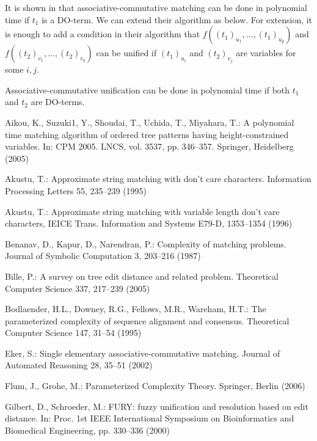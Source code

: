 \documentclass[a4paper]{llncs}
\begin{document}
It is shown in \cite{benanav87} that associative-commutative matching
can be done in polynomial time if $t_1$ is a DO-term.
We can extend their algorithm as below.
For extension, it is enough to add a condition in their algorithm that
$f((t_1)_{u_1},\ldots,(t_1)_{u_p})$ and
$f((t_2)_{v_1},\ldots,(t_2)_{v_q})$ can be unified
if $(t_1)_{u_i}$ and $(t_2)_{v_j}$ are variables for some $i,j$.

\begin{proposition}
Associative-commutative unification
can be done in polynomial time if both $t_1$ and $t_2$ are DO-terms.
\label{prop:do-ac-unif}
\end{proposition}

\begin{thebibliography}{99}

Aikou, K., Suzuki1, Y., Shoudai, T., Uchida, T., Miyahara, T.:
A polynomial time matching algorithm
of ordered tree patterns having height-constrained variables.
In: CPM 2005. LNCS, vol. 3537, pp. 346--357.
Springer, Heidelberg (2005)

Akustu, T.:
Approximate string matching with don't care characters.
Information Processing Letters 55, 235--239 (1995)

Akustu, T.:
Approximate string matching with variable length don't care characters,
IEICE Trans. Information and Systems E79-D, 1353--1354 (1996)


Benanav, D., Kapur, D., Narendran, P.:
Complexity of matching problems.
Journal of Symbolic Computation 3, 203--216 (1987)

Bille, P.:
A survey on tree edit distance and related problem.
Theoretical Computer Science 337, 217--239 (2005)

Bodlaender, H.L., Downey, R.G., Fellows, M.R., Wareham, H.T.:
The parameterized complexity of sequence alignment and consensus.
Theoretical Computer Science 147, 31--54 (1995)


Eker, S.:
Single elementary associative-commutative matching.
Journal of Automated Reasoning 28, 35--51 (2002)

Flum, J., Grohe, M.:
Parameterized Complexity Theory.
Springer, Berlin (2006)

Gilbert, D., Schroeder, M.:
FURY: fuzzy unification and resolution based on edit distance.
In: Proc. 1st IEEE International Symposium on Bioinformatics
and Biomedical Engineering, pp. 330--336 (2000)


\end{thebibliography}
\end{document}
